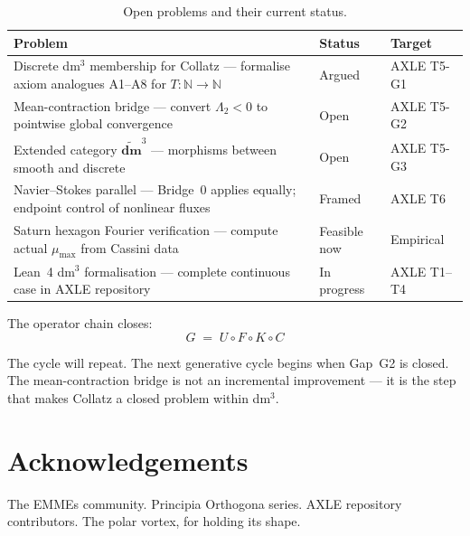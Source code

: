 \documentclass[11pt, a4paper]{article}
\theoremstyle{definition}
\newcommand{\dmt}{\widetilde{\mathbf{dm}}^3}
\newcommand{\Lam}{\Lambda}
\newcommand{\mumax}{\mu_{\max}}
\begin{document}
\begin{table}[H]
\centering
\small
\caption{Open problems and their current status.}
\label{tab:open}
\begin{tabular}{p{8cm} l l}
\toprule
Problem & Status & Target \\
\midrule
Discrete dm$^3$ membership for Collatz --- formalise axiom analogues A1--A8 for $T: \mathbb{N} \to \mathbb{N}$ & Argued & AXLE T5-G1 \\[4pt]
Mean-contraction bridge --- convert $\Lam_2 < 0$ to pointwise global convergence & Open & AXLE T5-G2 \\[4pt]
Extended category $\dmt$ --- morphisms between smooth and discrete & Open & AXLE T5-G3 \\[4pt]
Navier--Stokes parallel --- Bridge~0 applies equally; endpoint control of nonlinear fluxes & Framed & AXLE T6 \\[4pt]
Saturn hexagon Fourier verification --- compute actual $\mumax$ from Cassini data & Feasible now & Empirical \\[4pt]
Lean~4 dm$^3$ formalisation --- complete continuous case in AXLE repository & In progress & AXLE T1--T4 \\
\bottomrule
\end{tabular}
\end{table}

The operator chain closes:
\begin{equation}
  G \;=\; U \circ F \circ K \circ C
  \label{eq:chain}
\end{equation}

\noindent The cycle will repeat. The next generative cycle begins when Gap~G2 is closed.
The mean-contraction bridge is not an incremental improvement --- it is the step that makes
Collatz a closed problem within dm$^3$.

\section*{Acknowledgements}

The EMMEs community. Principia Orthogona series.
AXLE repository contributors. The polar vortex, for holding its shape.
\end{document}
